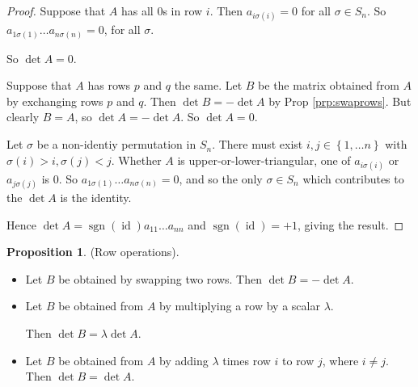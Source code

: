 \documentclass{article}
\theoremstyle{definition}
\newtheorem{proposition}[theorem]{Proposition}
\DeclareMathOperator{\sgn}{sgn}
\DeclareMathOperator{\id}{id}
\begin{document}
  \begin{proof}
    Suppose that $A$ has all $0$s in row $i$. Then $a_{i\sigma(i)}=0$ for all $\sigma \in S_{n}$. So $a_{1\sigma(1)}\dots a_{n\sigma(n)}=0$, for all $\sigma$.

    So $\det A = 0$.

    Suppose that $A$ has rows $p$ and $q$ the same. Let $B$ be the matrix obtained from $A$ by exchanging rows $p$ and $q$. Then $\det B=-\det A$ by Prop \ref{prp:swaprows}.  But clearly $B=A$, so $\det A = - \det A$. So $\det A=0$.

    Let $\sigma$ be a non-identiy permutation in $S_n$. There must exist $i,j \in \left\{ 1,\dots n \right\}$ with $\sigma(i) > i, \sigma(j)<j$. Whether $A$ is upper-or-lower-triangular, one of $a_{i\sigma(i)}$ or $a_{j\sigma(j)}$ is 0. So $a_{1\sigma(1)}\dots a_{n\sigma(n)}=0$, and so the only $\sigma \in S_n$ which contributes to the $\det A$ is the identity.

    Hence $\det A = \sgn(\id)a_{11}\dots a_{nn}$ and $\sgn(\id)=+1$, giving the result. 

  \end{proof}
    \begin{proposition}
      (Row operations).
      \begin{itemize}
        \item Let $B$ be obtained by swapping two rows. Then $\det B=-\det A$.
        \item Let $B$ be obtained from $A$ by multiplying a row by a scalar $\lambda$.

          Then $\det B = \lambda \det A$.
        \item Let $B$ be obtained from $A$ by adding $\lambda$ times row $i$ to row $j$, where $i \neq j$. 
          Then $\det B = \det A$.
      \end{itemize}
     \end{proposition}
 
\end{document}
